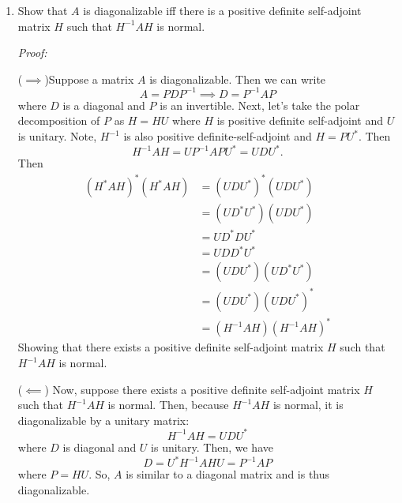 \documentclass[a4paper,12pt]{article}
\newcommand{\eps}{\varepsilon}
\newenvironment{proof}[2][$\square$]
    {\setlength{\parskip}{0pt}\par\textit{Proof:} #2\setlength{\parskip}{0.25cm}
        \savebox{\qed}{#1}
        \begin{adjustwidth}{\widthof{Proof:}}{}
    }
    {
        \hfill\usebox{\qed}\end{adjustwidth}
    }
\begin{document}
\begin{enumerate}[label = (\arabic*)]
\[{				O(\eps^2) & a_2 + O(\eps^2) & O(\eps^2) & \cdots & O(\eps^2) & O(\eps^3) \\
				O(\eps^2) &  O(\eps^2) & a_3 + O(\eps^2) & \cdots & O(\eps^2) & O(\eps^3) \\
				\vdots & \vdots & \vdots & \ddots &  & \vdots \\
				O(\eps^2) & O(\eps^2) & O(\eps^2) &  & a_{n-1} + O(\eps^2) & 0 \\
				O(\eps^3) &  O(\eps^3) & O(\eps^3) & \cdots & 0 & a_n + O(\eps^2)
			}.
	\]
	Thus, we can see that after a sweep, all of the off diagonal entries are at least $ O(\eps^2) $ which means that our matrix is moving towards the diagonal matrix quadratically.
	

	\newpage
	\item Show that $ A $ is diagonalizable iff there is a positive definite self-adjoint matrix $ H $ such that $ H^{-1} A H $ is normal.
	
	\begin{proof}{}
		($ \implies $)Suppose a matrix $ A $ is diagonalizable. Then we can write
		\[
			A = P D P^{-1} \implies D = P^{-1} A P
		\]
		where $ D $ is a diagonal and $ P $ is an invertible. Next, let's take the polar decomposition of $ P $ as $ H = HU $ where $ H $ is positive definite self-adjoint and $ U $ is unitary. Note, $ H^{-1} $ is also positive definite-self-adjoint and $ H = PU^* $. Then
		\[
			H^{-1} A H = U P^{-1} A P U^* = U D U^*.
		\]
		Then
		\begin{align*}
			(H^* A H)^*(H^* A H) &= (U D U^*)^*(U D U^*) \\
			&= (U D^* U^*)(U D U^*) \\
			&= U D^* D U^* \\
			&= U D D^* U^* \\
			&= (U D U^*) (U D^* U^*) \\
			&= (U D U^*) (U D U^*)^* \\
			&= (H^{-1} A H) (H^{-1} A H)^*
		\end{align*}
		Showing that there exists a positive definite self-adjoint matrix $ H  $ such that $ H^{-1}AH $ is normal.
		
		($ \impliedby $) Now, suppose there exists a positive definite self-adjoint matrix $ H $ such that $ H^{-1} A H $ is normal. Then, because $ H^{-1} A H $ is normal, it is diagonalizable by a unitary matrix:
		\[
			H^{-1} A H = U D U^*
		\]
		where $ D $ is diagonal and $ U $ is unitary. Then, we have
		\[
			D = U^* H^{-1} A H U = P^{-1} A P 
		\]
		where $ P = HU $. So, $ A $ is similar to a diagonal matrix and is thus diagonalizable.
	\end{proof}
\end{enumerate}
\end{document}
